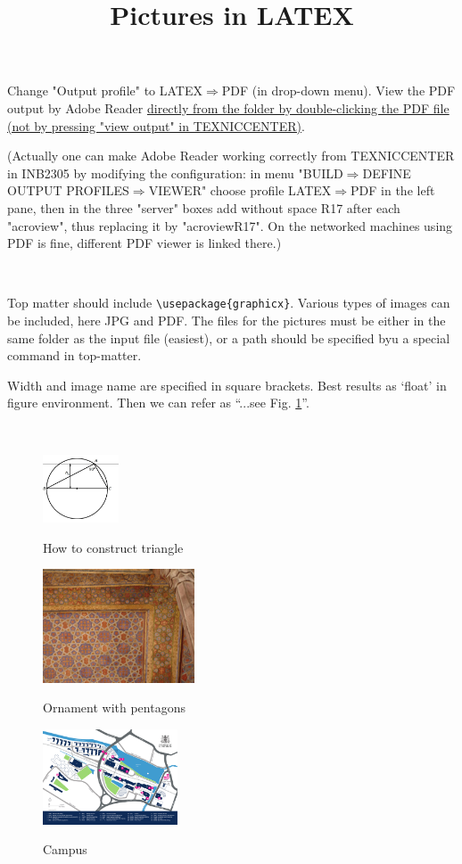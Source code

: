 \documentclass{article}
\begin{document}
\title{Pictures in LATEX}
\date{}
\maketitle

 Change "Output profile" to LATEX$\Rightarrow$PDF (in drop-down menu). View the PDF output by Adobe Reader \underline{directly from the folder by double-clicking the PDF file} \underline{(not by pressing "view output" in TEXNICCENTER)}.

(Actually one can make Adobe Reader working correctly from TEXNICCENTER in INB2305 by modifying the configuration: in menu "BUILD$\Rightarrow$DEFINE  OUTPUT PROFILES$\Rightarrow$VIEWER" choose profile LATEX$\Rightarrow$PDF in the left pane, then in the three "server" boxes add without space R17 after each "acroview", thus replacing it by "acroviewR17". On the networked machines using PDF is fine, different PDF viewer is linked there.)

\

Top matter should  include \verb#\usepackage{graphicx}#.
Various types of images can be included, here JPG and PDF. The files for the pictures must be either in the same folder as the input file (easiest), or a path should be specified byu a special command in top-matter.


Width and image name are specified in square brackets. Best results as `float' in
figure environment. Then we can refer as ``...see Fig. \ref{pict1}''.

\

\begin{figure}[h] %
  \centering %
  \includegraphics[width=0.2\textwidth]{constr-triangle.jpg}\\ %
  \caption{How to construct triangle}\label{pict1} %
\end{figure}



\begin{figure}[h]
  \centering
  \includegraphics[width=4.5cm]{esf.jpg}\\
  \caption{Ornament with pentagons}\label{orn}
\end{figure}

\begin{figure}[h]
  \centering
  \includegraphics[width=4cm]{map.pdf}\\
  \caption{Campus}\label{map}
\end{figure}
\end{document}
